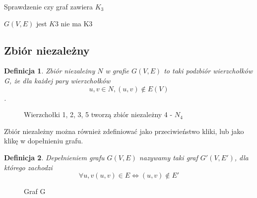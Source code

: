 \documentclass[11pt]{article}
\newtheorem{definition}{Definicja}[section]
\begin{document}
  \begin{algorithm}
    \caption{Sprawdzenie czy graf zawiera $K_3$}
    \begin{algorithmic}
    \REQUIRE $G(V, E) $
          \STATE \RETURN jest $K3$
        \ENDIF
      \ENDFOR
    \ENDFOR
    \STATE \RETURN nie ma K3
    \end{algorithmic}
  \end{algorithm}

  \subsection{Zbiór niezależny}
  \begin{definition}
    Zbiór niezależny $N$ w grafie $G(V,E)$ to taki podzbiór wierzchołków G, że dla każdej pary wierzchołków $$u, v \in N, (u, v) \notin E(V) $$. 
  \end{definition}

    \begin{figure}[H]
      \centering
        \caption{Wierzchołki 1, 2, 3, 5 tworzą zbiór niezależny 4 - $N_4$ }
     \end{figure}


     Zbiór niezależny można również zdefiniować jako przeciwieństwo kliki, lub jako klikę w dopełnieniu grafu.

    \begin{definition}
      Depełnieniem grafu $G(V,E)$ nazywamy taki graf $G'(V,E')$, 
      dla którego zachodzi 
      $$\forall{u,v} (u,v) \in E \iff (u,v) \notin E'$$
    \end{definition}
  
    \begin{figure}[H]
      \centering
        \caption{Graf G }
     \end{figure}
\end{document}
